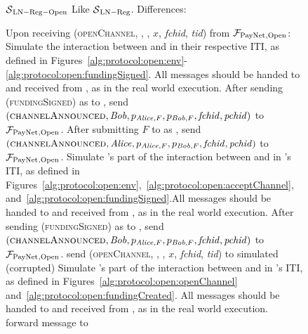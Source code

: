   \begin{figure}[H]
    \begin{simulatorbox}{$\mathcal{S}{}_{\mathrm{LN - Reg - Open}}$}
      Like $\mathcal{S}{}_{\mathrm{LN - Reg}}$. Differences:
      \begin{algorithmic}[1]
        \State Upon receiving (\textsc{openChannel}, \alice, \bob, $x$,
        \textit{fchid}, \textit{tid}) from $\mathcal{F}_{\mathrm{PayNet}}{}_{\mathrm{, Open}}$:
        \Indent
            \State Simulate the interaction between \alice{} and \bob{} in their
            respective ITI, as defined in
            Figures~\ref{alg:protocol:open:env}-\ref{alg:protocol:open:fundingSigned}.
            All messages should be handed to and received from \adversary, as in
            the real world execution.
            \State After sending (\textsc{fundingSigned}) as \bob{} to \alice,
            send $\left(\textsc{channelAnnounced}, \mathit{Bob}, p_{\mathit{Alice}, F}, p_{\mathit{Bob},
            F}, \mathit{fchid}, \mathit{pchid}\right)$ to $\mathcal{F}_{\mathrm{PayNet}}{}_{\mathrm{,
            Open}}$.
            \State After submitting $F$ to \ledger{} as \alice, send
            $\left(\textsc{channelAnnounced}, \mathit{Alice}, p_{\mathit{Alice}, F}, p_{\mathit{Bob},
            F}, \mathit{fchid}, \mathit{pchid}\right)$ to $\mathcal{F}_{\mathrm{PayNet}}{}_{\mathrm{,
            Open}}$.
            \State Simulate \alice's part of the interaction between \alice{}
            and \bob{} in \alice's ITI, as defined in
            Figures~\ref{alg:protocol:open:env},~\ref{alg:protocol:open:acceptChannel},
            and~\ref{alg:protocol:open:fundingSigned}.All messages should be
            handed to and received from \adversary, as in the real world
            execution.
            \State After sending (\textsc{fundingSigned}) as \bob{} to \alice,
            send $\left(\textsc{channelAnnounced}, \mathit{Bob}, p_{\mathit{Alice}, F}, p_{\mathit{Bob},
            F}, \mathit{fchid}, \mathit{pchid}\right)$ to $\mathcal{F}_{\mathrm{PayNet}}{}_{\mathrm{,
            Open}}$.
            \State send (\textsc{openChannel}, \alice, \bob, $x$,
            \textit{fchid}, \textit{tid}) to simulated (corrupted) \alice
            \State Simulate \bob's part of the interaction between \alice{}
            and \bob{} in \bob's ITI, as defined in
            Figures~\ref{alg:protocol:open:openChannel}
            and~\ref{alg:protocol:open:fundingCreated}.
            All messages should be handed to and received from \adversary, as in
            the real world execution.
            \State forward message to \adversary{} 
          \EndIf
        \EndIndent
        \Statex


\end{algorithmic}
\end{simulatorbox}
\end{figure}
